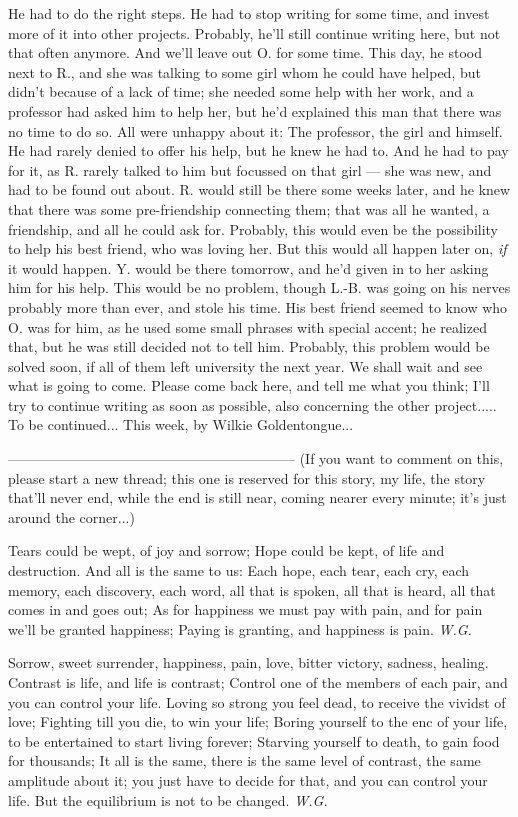 He had to do the right steps. 
He had to stop writing for some time, and invest more of it into other projects. Probably, he'll still continue writing here, but not that often anymore. 
And we'll leave out O. for some time. 
This day, he stood next to R., and she was talking to some girl whom he could have helped, but didn't because of a lack of time; she needed some help with her work, and a professor had asked him to help her, but he'd explained this man that there was no time to do so. 
All were unhappy about it: The professor, the girl and himself. He had rarely denied to offer his help, but he knew he had to. 
And he had to pay for it, as R. rarely talked to him but focussed on that girl --- she was new, and had to be found out about. 
R. would still be there some weeks later, and he knew that there was some pre-friendship connecting them; that was all he wanted, a friendship, and all he could ask for. Probably, this would even be the possibility to help his best friend, who was loving her. 
But this would all happen later on, \emph{if} it would happen. 
Y. would be there tomorrow, and he'd given in to her asking him for his help. This would be no problem, though L.-B. was going on his nerves probably more than ever, and stole his time. 
His best friend seemed to know who O. was for him, as he used some small phrases with special accent; he realized that, but he was still decided not to tell him. Probably, this problem would be solved soon, if all of them left university the next year. 
We shall wait and see what is going to come. 
Please come back here, and tell me what you think; I'll try to continue writing as soon as possible, also concerning the other project.....
To be continued...
This week, by Wilkie Goldentongue...

--------------------------------------------------------------
(If you want to comment on this, please start a new thread; this one is reserved for this story, my life, the story that'll never end, while the end is still near, coming nearer every minute; it's just around the corner...)

Tears could be wept, 
of joy and sorrow; 
Hope could be kept, 
of life and destruction. 
And all is the same to us: 
Each hope, each tear, each cry, 
each memory, each discovery, each word, 
all that is spoken, all that is heard, 
all that comes in and goes out; 
As for happiness we must pay with pain, 
and for pain we'll be granted happiness; 
Paying is granting, 
and happiness is pain. 
\emph{W.G.}

Sorrow, 
sweet surrender, 
happiness, 
pain, 
love, 
bitter victory, 
sadness, 
healing. 
Contrast is life, 
and life is contrast; 
Control one of the members 
of each pair, 
and you can control your life. 
Loving so strong you feel dead, 
to receive the vividst of love; 
Fighting till you die, 
to win your life; 
Boring yourself to the enc of your life, 
to be entertained to start living forever; 
Starving yourself to death, 
to gain food for thousands; 
It all is the same, 
there is the same level of contrast, 
the same amplitude 
about it; 
you just have to decide for that, 
and you can control your life. 
But the equilibrium 
is not to be changed. 
\emph{W.G.}
